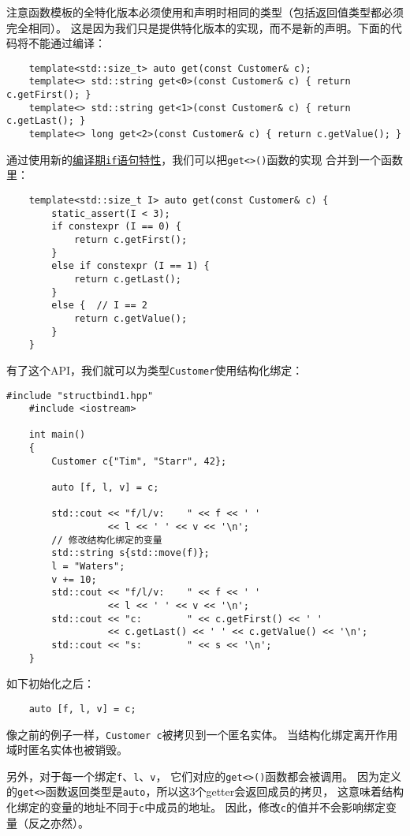 注意函数模板的全特化版本必须使用和声明时相同的类型（包括返回值类型都必须完全相同）。
这是因为我们只是提供特化版本的实现，而不是新的声明。下面的代码将不能通过编译：
\begin{lstlisting}
    template<std::size_t> auto get(const Customer& c);
    template<> std::string get<0>(const Customer& c) { return c.getFirst(); }
    template<> std::string get<1>(const Customer& c) { return c.getLast(); }
    template<> long get<2>(const Customer& c) { return c.getValue(); }
\end{lstlisting}
通过使用新的\hyperref[ch10]{编译期\texttt{if}语句特性}，我们可以把\texttt{get<>()}函数的实现
合并到一个函数里：
\begin{lstlisting}
    template<std::size_t I> auto get(const Customer& c) {
        static_assert(I < 3);
        if constexpr (I == 0) {
            return c.getFirst();
        }
        else if constexpr (I == 1) {
            return c.getLast();
        }
        else {  // I == 2
            return c.getValue();
        }
    }
\end{lstlisting}
有了这个API，我们就可以为类型\texttt{Customer}使用结构化绑定：
\begin{lstlisting}[frame=single, title=lang/structbind1.cpp]
    #include "structbind1.hpp"
    #include <iostream>

    int main()
    {
        Customer c{"Tim", "Starr", 42};

        auto [f, l, v] = c;

        std::cout << "f/l/v:    " << f << ' '
                  << l << ' ' << v << '\n';
        // 修改结构化绑定的变量
        std::string s{std::move(f)};
        l = "Waters";
        v += 10;
        std::cout << "f/l/v:    " << f << ' '
                  << l << ' ' << v << '\n';
        std::cout << "c:        " << c.getFirst() << ' '
                  << c.getLast() << ' ' << c.getValue() << '\n';
        std::cout << "s:        " << s << '\n';
    }
\end{lstlisting}
如下初始化之后：
\begin{lstlisting}
    auto [f, l, v] = c;
\end{lstlisting}
像之前的例子一样，\texttt{Customer c}被拷贝到一个匿名实体。
当结构化绑定离开作用域时匿名实体也被销毁。

另外，对于每一个绑定\texttt{f}、\texttt{l}、\texttt{v}，
它们对应的\texttt{get<>()}函数都会被调用。
因为定义的\texttt{get<>}函数返回类型是\texttt{auto}，所以这3个getter会返回成员的拷贝，
这意味着结构化绑定的变量的地址不同于\texttt{c}中成员的地址。
因此，修改\texttt{c}的值并不会影响绑定变量（反之亦然）。

